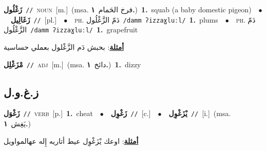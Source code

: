 \documentclass[10pt,a4paper,twoside]{article} %
\begin{document}
\begin{multicols}{2}
{\setlength\topsep{0pt}\textbf{\foreignlanguage{arabic}{زَغْلُول}}\ {\color{gray}\texttt{//}\color{black}}\ \textsc{noun}\ [m.]\ \color{gray}(msa. \foreignlanguage{arabic}{فرخ الحَمام}~\foreignlanguage{arabic}{\textbf{١.}})\color{black}\ \textbf{1.}~squab (a baby domestic pigeon)\ \ $\bullet$\ \ \setlength\topsep{0pt}\textbf{\foreignlanguage{arabic}{زَغَالِيل}}\ {\color{gray}\texttt{//}\color{black}}\ [pl.]\ \ $\bullet$\ \ \textsc{ph.} \color{gray} \foreignlanguage{arabic}{دَمّ الزَّغْلُول}\color{black}\ {\color{gray}\texttt{/{\sffamily damm ʔizzaɣluːl}/}\color{black}}\ \textbf{1.}~plums\ \ $\bullet$\ \ \textsc{ph.} \color{gray} \foreignlanguage{arabic}{دَمّ الزَّغْلُول}\color{black}\ {\color{gray}\texttt{/{\sffamily damm ʔizzaɣluːl}/}\color{black}}\ \textbf{1.}~grapefruit\  \begin{flushright}\color{gray}\foreignlanguage{arabic}{\textbf{\underline{\foreignlanguage{arabic}{أمثلة}}}: بحبش دَم الزَّغْلول بعملي حساسية}\end{flushright}\color{black}} \vspace{2mm}

{\setlength\topsep{0pt}\textbf{\foreignlanguage{arabic}{مْزَغْلِل}}\ {\color{gray}\texttt{//}\color{black}}\ \textsc{adj}\ [m.]\ \color{gray}(msa. \foreignlanguage{arabic}{دائخ}~\foreignlanguage{arabic}{\textbf{١.}})\color{black}\ \textbf{1.}~dizzy\ } \vspace{2mm}

\vspace{-3mm}
\subsection*{\color{blue}\foreignlanguage{arabic}{ز.غ.و.ل}\color{blue}{}} 

{\setlength\topsep{0pt}\textbf{\foreignlanguage{arabic}{زَغْوَل}}\ {\color{gray}\texttt{//}\color{black}}\ \textsc{verb}\ [p.]\ \textbf{1.}~cheat\ \ $\bullet$\ \ \setlength\topsep{0pt}\textbf{\foreignlanguage{arabic}{زَغْوِل}}\ {\color{gray}\texttt{//}\color{black}}\ [c.]\ \ $\bullet$\ \ \setlength\topsep{0pt}\textbf{\foreignlanguage{arabic}{يْزَغْوِل}}\ {\color{gray}\texttt{//}\color{black}}\ [i.]\ \color{gray}(msa. \foreignlanguage{arabic}{يَغِش}~\foreignlanguage{arabic}{\textbf{١.}})\color{black}\  \begin{flushright}\color{gray}\foreignlanguage{arabic}{\textbf{\underline{\foreignlanguage{arabic}{أمثلة}}}: اوعك يْزَغْوِل عيط أتاريه إِله عهالمواويل}\end{flushright}\color{black}} \vspace{2mm}


\end{multicols}
\end{document}
